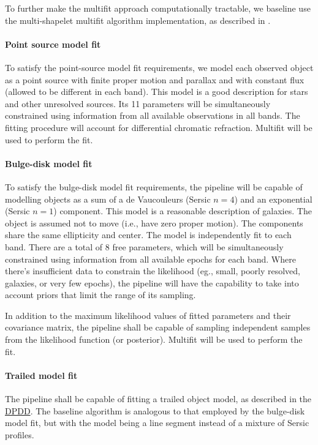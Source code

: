 \documentclass[12pt]{article}
\newcommand{\ds}[2]{{\color{blue} \href{https://docushare.lsstcorp.org/docushare/dsweb/Get/#1}{#2}}\xspace}
\newcommand{\DPDD}{\ds{LSE-163}{DPDD}}
\begin{document}
To further make the multifit approach computationally tractable, we baseline use the multi-shapelet multifit algorithm implementation, as described in \cite{Bosch13}.

\paragraph{Point source model fit} To satisfy the point-source model fit requirements, we model each observed object as a point source with finite proper motion and parallax and with constant flux (allowed to be different in each band). This model is a good description for stars and other unresolved sources. Its 11 parameters will be simultaneously constrained using information from all available observations in all bands. The fitting procedure will account for differential chromatic refraction. Multifit will be used to perform the fit.

\paragraph{Bulge-disk model fit} To satisfy the bulge-disk model fit requirements, the pipeline will be capable of modelling objects as a sum of a de Vaucouleurs (Sersic $n=4$) and an exponential (Sersic $n=1$) component. This model is a reasonable description of galaxies. The object is assumed not to move (i.e., have zero proper motion). The components share the same ellipticity and center. The model is independently fit to each band. There are a total of 8 free parameters, which will be simultaneously constrained using information from all available epochs for each band. Where there's insufficient data to constrain the likelihood (eg., small, poorly resolved, galaxies, or very few epochs), the pipeline will have the capability to take into account priors that limit the range of its sampling.

In addition to the maximum likelihood values of fitted parameters and their covariance matrix, the pipeline shall be capable of sampling independent samples from the likelihood function (or posterior). Multifit will be used to perform the fit.

\paragraph{Trailed model fit}

The pipeline shall be capable of fitting a trailed object model, as described in the \DPDD. The baseline algorithm is analogous to that employed by the bulge-disk model fit, but with the model being a line segment instead of a mixture of Sersic profiles.
\end{document}
